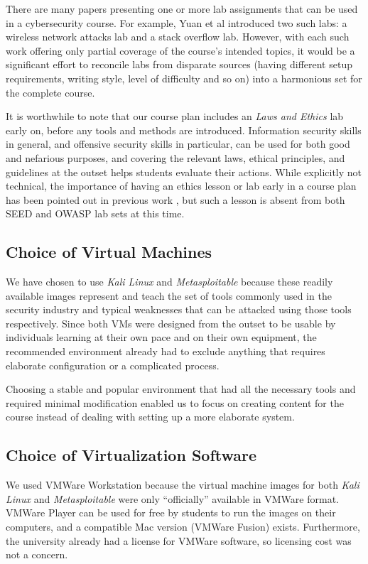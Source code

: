 \documentclass{sig-alternate-2013}
\begin{document}
There are many papers presenting one or more lab assignments that can be used in a cybersecurity course.
For example, Yuan et al \cite{yuan2014labsandtools} introduced two such labs: a wireless network attacks lab and a stack overflow lab.
However, with each such work offering only partial coverage of the course's intended topics, 
it would be a significant effort to reconcile labs from disparate sources
(having different setup requirements, writing style, level of difficulty and so on) into a harmonious set for the complete course.

It is worthwhile to note that our course plan includes an \emph{Laws and Ethics} lab early on, before any
tools and methods are introduced. Information security skills in general, and offensive security skills in particular, can
be used for both good and nefarious purposes, and covering the relevant laws, ethical principles, and guidelines at the outset
helps students evaluate their actions. While explicitly not technical, the importance of having an ethics lesson or lab early in
a course plan has been pointed out in previous work \cite{cook2012good}, 
but such a lesson is absent from both SEED and OWASP lab sets at this time. 

\subsection{Choice of Virtual Machines}

We have chosen to use \emph{Kali Linux} and \emph{Metasploitable} because these readily available images 
represent and teach the set of tools commonly used in the security industry and typical weaknesses that can be attacked using 
those tools respectively. Since both VMs were designed from the outset to be usable by individuals learning at their own pace 
and on their own equipment, the recommended environment already had to exclude anything that requires 
elaborate configuration or a complicated process.

Choosing a stable and popular environment that had all the necessary tools and required minimal modification enabled us 
to focus on creating content for the course instead of dealing with setting up a more elaborate system.

\subsection{Choice of Virtualization Software}

We used VMWare Workstation because the virtual machine images 
for both \emph{Kali Linux} and \emph{Metasploitable} 
were only ``officially'' available in VMWare format. VMWare Player can be
used for free by students to run the images on their computers, and a compatible 
Mac version (VMWare Fusion) exists. Furthermore, the university already had a 
license for VMWare software, so licensing cost was not a concern.
\end{document}
